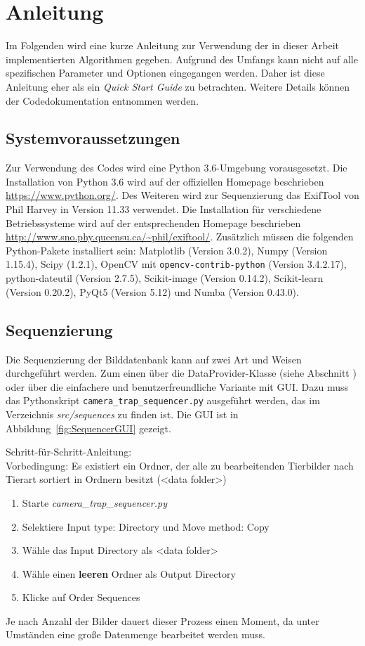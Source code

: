 \section*{Anleitung}
Im Folgenden wird eine kurze Anleitung zur Verwendung der in dieser Arbeit implementierten Algorithmen gegeben. Aufgrund des Umfangs kann nicht auf alle spezifischen Parameter und Optionen eingegangen werden. Daher ist diese Anleitung eher als ein \emph{Quick Start Guide} zu betrachten. Weitere Details können der Codedokumentation entnommen werden.

\subsection*{Systemvoraussetzungen}
Zur Verwendung des Codes wird eine Python 3.6-Umgebung vorausgesetzt. Die Installation von Python 3.6 wird auf der offiziellen Homepage beschrieben \url{https://www.python.org/}. Des Weiteren wird zur Sequenzierung das ExifTool von Phil Harvey in Version 11.33 verwendet. Die Installation für verschiedene Betriebssysteme wird auf der entsprechenden Homepage beschrieben \url{http://www.sno.phy.queensu.ca/~phil/exiftool/}. Zusätzlich müssen die folgenden Python-Pakete installiert sein: Matplotlib (Version 3.0.2), Numpy (Version 1.15.4), Scipy (1.2.1),  OpenCV mit \texttt{opencv-contrib-python} (Version 3.4.2.17), python-dateutil (Version 2.7.5), Scikit-image (Version 0.14.2), Scikit-learn (Version 0.20.2), PyQt5 (Version 5.12) und Numba (Version 0.43.0).

\subsection*{Sequenzierung}
Die Sequenzierung der Bilddatenbank kann auf zwei Art und Weisen durchgeführt werden. Zum einen über die DataProvider-Klasse (siehe Abschnitt ) oder über die einfachere und benutzerfreundliche Variante mit GUI. Dazu muss das Pythonskript  \texttt{camera\_trap\_sequencer.py} ausgeführt werden, das im Verzeichnis \emph{src/sequences} zu finden ist. Die GUI ist in Abbildung~\ref{fig:SequencerGUI} gezeigt. 

Schritt-für-Schritt-Anleitung:\\
Vorbedingung: Es existiert ein Ordner, der alle zu bearbeitenden Tierbilder nach Tierart sortiert in Ordnern besitzt (<data folder>)
\begin{enumerate}
\item Starte \emph{camera\_trap\_sequencer.py}
\item Selektiere Input type: Directory und Move method: Copy
\item Wähle das Input Directory als <data folder>
\item Wähle einen \textbf{leeren} Ordner als Output Directory
\item Klicke auf Order Sequences
\end{enumerate}
Je nach Anzahl der Bilder dauert dieser Prozess einen Moment, da unter Umständen eine große Datenmenge bearbeitet werden muss.

